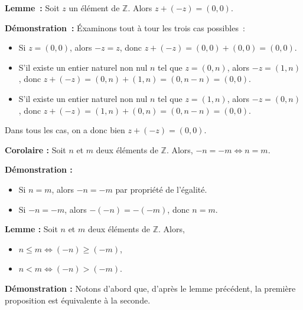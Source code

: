 \done

\medskip

\noindent\textbf{Lemme :} Soit $z$ un élément de $\mathbb{Z}$. 
    Alors $z + (-z) = (0,0)$.

\medskip

\noindent\textbf{Démonstration :} Éxaminons tout à tour les trois cas possibles : 
\begin{itemize}[nosep]
    \item Si $z = (0,0)$, alors $-z = z$, donc $z + (-z) = (0,0) + (0,0) = (0,0)$.
    \item S'il existe un entier naturel non nul $n$ tel que $z = (0,n)$, alors $-z = (1,n)$, donc $z + (-z) = (0,n) + (1,n) = (0,n-n) = (0,0)$.
    \item S'il existe un entier naturel non nul $n$ tel que $z = (1,n)$, alors $-z = (0,n)$, donc $z + (-z) = (1,n) + (0,n) = (0,n-n) = (0,0)$.
\end{itemize}
Dans tous les cas, on a donc bien $z + (-z) = (0,0)$.

\done

\medskip

\noindent\textbf{Corolaire :} Soit $n$ et $m$ deux éléments de $\mathbb{Z}$. 
    Alors, $-n = -m \Leftrightarrow n = m$.

\medskip

\noindent\textbf{Démonstration :} 
    \begin{itemize}[nosep]
        \item Si $n = m$, alors $-n = -m$ par propriété de l'égalité.
        \item Si $-n = -m$, alors $-(-n) = -(-m)$, donc $n = m$.
    \end{itemize}

    \done

\medskip

\noindent\textbf{Lemme :} Soit $n$ et $m$ deux éléments de $\mathbb{Z}$.
    Alors, 
    \begin{itemize}[nosep]
        \item $n \leq m \Leftrightarrow (-n) \geq (-m)$,
        \item $n < m \Leftrightarrow (-n) > (-m)$. 
    \end{itemize}

\medskip

\noindent\textbf{Démonstration :} 
    Notons d'abord que, d'après le lemme précédent, la première proposition est équivalente à la seconde. 

